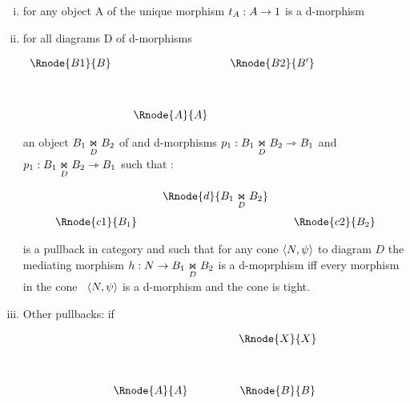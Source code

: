 \documentclass[10pt,a4paper]{scrartcl}
\begin{document}
\begin{enumerate} [(i)]
	\item for any object A of  the unique morphism $t_A:A \morph 1$ is a d-morphism
	
	
	\item for all diagrams D of d-morphisms \begin{center}
$
\begin{array}{cp{0cm}cp{0cm}c}
\Rnode{B1}{B}& &            &  &\Rnode{B2}{B'} \\ [1.2cm]
               & &\Rnode{A}{A}& &
\end{array}
$
\end{center}
	
an object  $ \fibrex{B_1}{B_2}{D}$ of  and d-morphisms 
$p_1: \fibrex{B_1}{B_2}{D} \dmorph B_1$ and  $p_1: \fibrex{B_1}{B_2}{D} \dmorph B_1$ such that :

\begin{center}
\begin{displaymath}
\begin{array}{cp{0.1cm}cp{0.1cm} c}
            & &\Rnode{d}{\fibrex{B_1}{B_2}{D}}                  \\ [0.4cm]
\Rnode{c1}{B_1}& &                & & \Rnode{c2}{B_2} 
\end{array}
\end{displaymath}
\end{center}

is a pullback in category  and such that for any 
cone $\tuple{N,\psi}$ to diagram $D$
the mediating morphism $h: N \morph B_1 \underset{D}{\Join} B_2$ is a d-moprphism iff 
every morphism in the cone \ $\tuple{N,\psi}$ is a d-morphism and the cone is tight.

	\item Other pullbacks: if
\begin{center}
\begin{displaymath}
\begin{array}{cp{.9cm}c}
            & & \Rnode{X}{X} \\ [1.2cm]
\Rnode{A}{A}& & \Rnode{B}{B} \\
\end{array}
\end{displaymath}
\end{center}


\end{enumerate}
\end{document}
